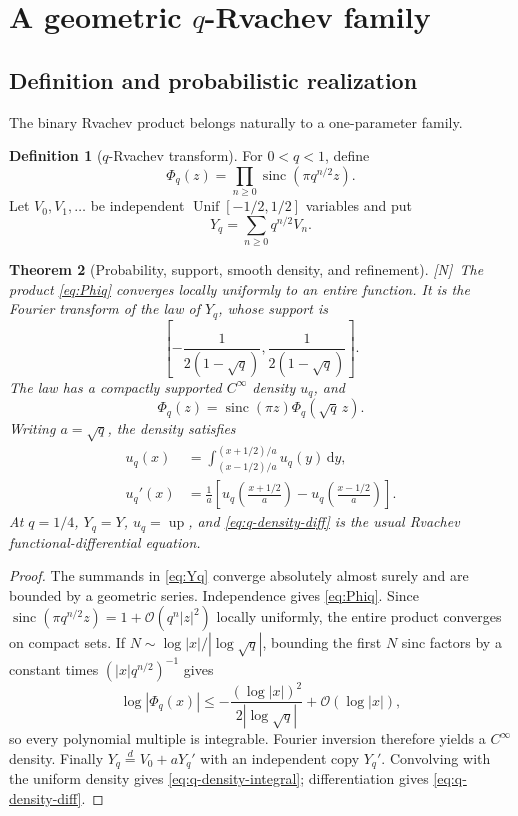 \documentclass[11pt,oneside]{article}
\newtheorem{theorem}{Theorem}[section]
\theoremstyle{definition}
\newtheorem{definition}[theorem]{Definition}
\theoremstyle{remark}
\newcommand{\Up}{\operatorname{up}}
\newcommand{\sinc}{\operatorname{sinc}}
\newcommand{\dd}{\,\mathrm d}
\newcommand{\bigO}{\mathcal O}
\newcommand{\statusN}{\textsf{[N]}}
\begin{document}
\section{A geometric $q$-Rvachev family}
\label{sec:qfamily}

\subsection{Definition and probabilistic realization}
The binary Rvachev product belongs naturally to a one-parameter family.

\begin{definition}[$q$-Rvachev transform]
For $0<q<1$, define
\begin{equation}
 \Phi_q(z)=\prod_{n\ge0}\sinc(\pi q^{n/2}z).               \label{eq:Phiq}
\end{equation}
Let $V_0,V_1,\ldots$ be independent $\operatorname{Unif}[-1/2,1/2]$ variables and put
\begin{equation}
 Y_q=\sum_{n\ge0}q^{n/2}V_n.                               \label{eq:Yq}
\end{equation}
\end{definition}

\begin{theorem}[Probability, support, smooth density, and refinement]\label{thm:q-density}
\statusN\ The product \eqref{eq:Phiq} converges locally uniformly to an entire function.
It is the Fourier transform of the law of $Y_q$, whose support is
\[
 \left[-\frac1{2(1-\sqrt q)},\frac1{2(1-\sqrt q)}\right].
\]
The law has a compactly supported $C^\infty$ density $u_q$, and
\begin{equation}
 \Phi_q(z)=\sinc(\pi z)\Phi_q(\sqrt q\,z).                 \label{eq:q-refine-Fourier}
\end{equation}
Writing $a=\sqrt q$, the density satisfies
\begin{align}
 u_q(x)&=\int_{(x-1/2)/a}^{(x+1/2)/a}u_q(y)\dd y,           \label{eq:q-density-integral}\\
 u_q'(x)&=\frac1a\left[u_q\!\left(\frac{x+1/2}{a}\right)
                     -u_q\!\left(\frac{x-1/2}{a}\right)\right]. \label{eq:q-density-diff}
\end{align}
At $q=1/4$, $Y_q=Y$, $u_q=\Up$, and \eqref{eq:q-density-diff} is the usual Rvachev
functional-differential equation.
\end{theorem}

\begin{proof}
The summands in \eqref{eq:Yq} converge absolutely almost surely and are bounded by a
geometric series.  Independence gives \eqref{eq:Phiq}.  Since
$\sinc(\pi q^{n/2}z)=1+\bigO(q^n|z|^2)$ locally uniformly, the entire product converges on
compact sets.  If $N\sim\log|x|/|\log\sqrt q|$, bounding the first $N$ sinc factors by a
constant times $(|x|q^{n/2})^{-1}$ gives
\[
 \log|\Phi_q(x)|\le-\frac{(\log|x|)^2}{2|\log\sqrt q|}+\bigO(\log|x|),
\]
so every polynomial multiple is integrable.  Fourier inversion therefore yields a
$C^\infty$ density.  Finally $Y_q\overset d=V_0+aY_q'$ with an independent copy $Y_q'$.
Convolving with the uniform density gives \eqref{eq:q-density-integral}; differentiation
gives \eqref{eq:q-density-diff}.
\end{proof}
\end{document}
